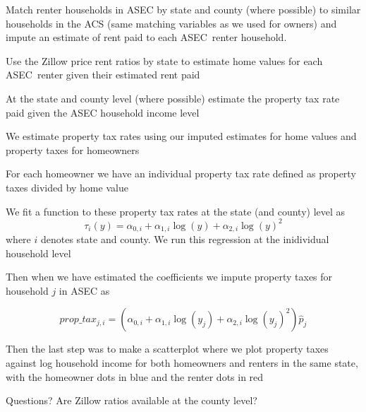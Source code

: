 \documentclass[12pt]{article}
\begin{document}
Match renter households in ASEC by state and county (where possible) to
similar households in the ACS (same matching variables as we used for
owners) and impute an estimate of rent paid to each ASEC\ renter household.

Use the Zillow price rent ratios by state to estimate home values for each
ASEC\ renter given their estimated rent paid

At the state and county level (where possible) estimate the property tax
rate paid given the ASEC household income level

We estimate property tax rates using our imputed estimates for home values
and property taxes for homeowners

For each homeowner we have an individual property tax rate defined as
property taxes divided by home value

We fit a function to these property tax rates at the state (and county)
level as%
\[
\tau _{i}(y)=\alpha _{0,i}+\alpha _{1,i}\log (y)+\alpha _{2,i}\log (y)^{2}
\]%
where $i$ denotes state and county. We run this regression at the
inidividual household level

Then when we have estimated the coefficients we impute property taxes for
household $j$ in ASEC as

\[
prop\_tax_{j,i}=\left( \alpha _{0,i}+\alpha _{1,i}\log (y_{j})+\alpha
_{2,i}\log (y_{j})^{2}\right) \hat{p}_{j}
\]

Then the last step was to make a scatterplot where we plot property taxes
against log household income for both homeowners and renters in the same
state, with the homeowner dots in blue and the renter dots in red

\bigskip 

Questions? Are Zillow ratios available at the county level?
\end{document}
